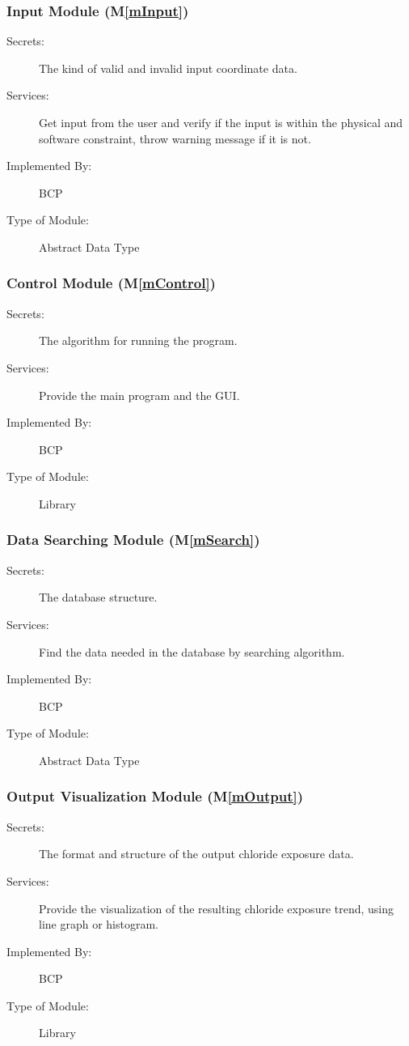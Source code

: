 \documentclass[12pt, titlepage]{article}
\newcommand{\mref}[1]{M\ref{#1}}
\begin{document}
\subsubsection{Input Module (\mref{mInput})}

\begin{description}
\item[Secrets:] The kind of valid and invalid input coordinate data. 
\item[Services:] Get input from the user and verify if the input is within the physical and software constraint, throw warning message if it is not. 
\item[Implemented By:] BCP
\item[Type of Module:] Abstract Data Type
\end{description}


\subsubsection{Control Module (\mref{mControl})}
\begin{description}
\item[Secrets:] The algorithm for running the program.
\item[Services:] Provide the main program and the GUI.
\item[Implemented By:] BCP
\item[Type of Module:] Library
\end{description}

\subsubsection{Data Searching Module (\mref{mSearch})}
\begin{description}
\item[Secrets:] The database structure.
\item[Services:] Find the data needed in the database by searching algorithm.
\item[Implemented By:] BCP
\item[Type of Module:] Abstract Data Type
\end{description}

\subsubsection{Output Visualization Module (\mref{mOutput})}
\begin{description}
\item[Secrets:] The format and structure of the output chloride exposure data.
\item[Services:] Provide the visualization of the resulting chloride exposure trend, using line graph or histogram. 
\item[Implemented By:] BCP
\item[Type of Module:] Library
\end{description}
\end{document}
